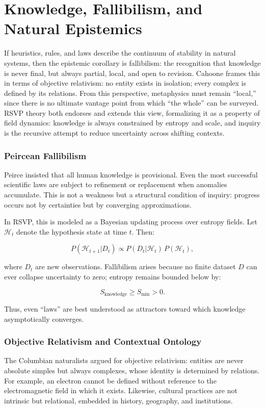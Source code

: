 \documentclass[12pt]{book}
\begin{document}
\chapter{Knowledge, Fallibilism, and Natural Epistemics}
If heuristics, rules, and laws describe the continuum of stability in natural systems, then the epistemic corollary is fallibilism: the recognition that knowledge is never final, but always partial, local, and open to revision. Cahoone frames this in terms of objective relativism: no entity exists in isolation; every complex is defined by its relations. From this perspective, metaphysics must remain “local,” since there is no ultimate vantage point from which “the whole” can be surveyed. RSVP theory both endorses and extends this view, formalizing it as a property of field dynamics: knowledge is always constrained by entropy and scale, and inquiry is the recursive attempt to reduce uncertainty across shifting contexts.

\subsection{Peircean Fallibilism}
Peirce insisted that all human knowledge is provisional. Even the most successful scientific laws are subject to refinement or replacement when anomalies accumulate. This is not a weakness but a structural condition of inquiry: progress occurs not by certainties but by converging approximations.

In RSVP, this is modeled as a Bayesian updating process over entropy fields. Let \( \mathcal{H}_t \) denote the hypothesis state at time \( t \). Then:

\[ P(\mathcal{H}_{t+1} | D_t) \propto P(D_t | \mathcal{H}_t) \, P(\mathcal{H}_t), \]

where \( D_t \) are new observations. Fallibilism arises because no finite dataset \( D \) can ever collapse uncertainty to zero; entropy remains bounded below by:

\[ S_{\text{knowledge}} \geq S_{\text{min}} > 0. \]

Thus, even “laws” are best understood as attractors toward which knowledge asymptotically converges.

\subsection{Objective Relativism and Contextual Ontology}
The Columbian naturalists argued for objective relativism: entities are never absolute simples but always complexes, whose identity is determined by relations. For example, an electron cannot be defined without reference to the electromagnetic field in which it exists. Likewise, cultural practices are not intrinsic but relational, embedded in history, geography, and institutions.
\end{document}
